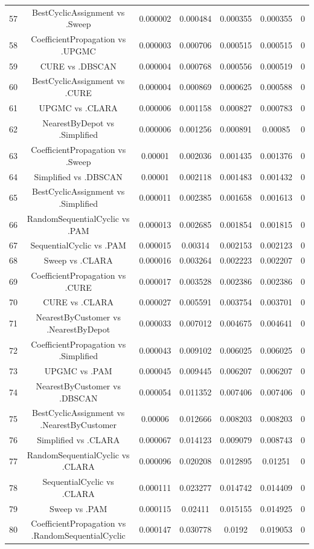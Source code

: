 \documentclass[a4paper,10pt]{article}
\begin{document}
\begin{landscape}
\begin{table}[!htp]
\begin{tabular}{ccccccc}
57&BestCyclicAssignment vs .Sweep&0.000002&0.000484&0.000355&0.000355&0\\
58&CoefficientPropagation vs .UPGMC&0.000003&0.000706&0.000515&0.000515&0\\
59&CURE vs .DBSCAN&0.000004&0.000768&0.000556&0.000519&0\\
60&BestCyclicAssignment vs .CURE&0.000004&0.000869&0.000625&0.000588&0\\
61&UPGMC vs .CLARA&0.000006&0.001158&0.000827&0.000783&0\\
62&NearestByDepot vs .Simplified&0.000006&0.001256&0.000891&0.00085&0\\
63&CoefficientPropagation vs .Sweep&0.00001&0.002036&0.001435&0.001376&0\\
64&Simplified vs .DBSCAN&0.00001&0.002118&0.001483&0.001432&0\\
65&BestCyclicAssignment vs .Simplified&0.000011&0.002385&0.001658&0.001613&0\\
66&RandomSequentialCyclic vs .PAM&0.000013&0.002685&0.001854&0.001815&0\\
67&SequentialCyclic vs .PAM&0.000015&0.00314&0.002153&0.002123&0\\
68&Sweep vs .CLARA&0.000016&0.003264&0.002223&0.002207&0\\
69&CoefficientPropagation vs .CURE&0.000017&0.003528&0.002386&0.002386&0\\
70&CURE vs .CLARA&0.000027&0.005591&0.003754&0.003701&0\\
71&NearestByCustomer vs .NearestByDepot&0.000033&0.007012&0.004675&0.004641&0\\
72&CoefficientPropagation vs .Simplified&0.000043&0.009102&0.006025&0.006025&0\\
73&UPGMC vs .PAM&0.000045&0.009445&0.006207&0.006207&0\\
74&NearestByCustomer vs .DBSCAN&0.000054&0.011352&0.007406&0.007406&0\\
75&BestCyclicAssignment vs .NearestByCustomer&0.00006&0.012666&0.008203&0.008203&0\\
76&Simplified vs .CLARA&0.000067&0.014123&0.009079&0.008743&0\\
77&RandomSequentialCyclic vs .CLARA&0.000096&0.020208&0.012895&0.01251&0\\
78&SequentialCyclic vs .CLARA&0.000111&0.023277&0.014742&0.014409&0\\
79&Sweep vs .PAM&0.000115&0.02411&0.015155&0.014925&0\\
80&CoefficientPropagation vs .RandomSequentialCyclic&0.000147&0.030778&0.0192&0.019053&0\\

\end{tabular}
\end{table}
\end{landscape}
\end{document}
